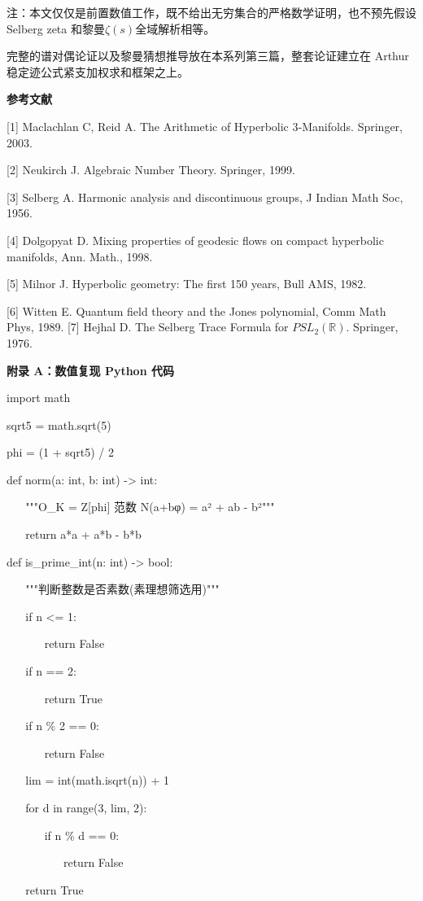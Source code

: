 \documentclass[12pt]{article}
\begin{document}
注：本文仅仅是前置数值工作，既不给出无穷集合的严格数学证明，也不预先假设
Selberg zeta 和黎曼\(\zeta(s)\)全域解析相等。

完整的谱对偶论证以及黎曼猜想推导放在本系列第三篇，整套论证建立在 Arthur
稳定迹公式紧支加权求和框架之上。

\textbf{参考文献}

{[}1{]} Maclachlan C, Reid A. The Arithmetic of Hyperbolic 3‑Manifolds.
Springer, 2003.

{[}2{]} Neukirch J. Algebraic Number Theory. Springer, 1999.

{[}3{]} Selberg A. Harmonic analysis and discontinuous groups, J Indian
Math Soc, 1956.

{[}4{]} Dolgopyat D. Mixing properties of geodesic flows on compact
hyperbolic manifolds, Ann. Math., 1998.

{[}5{]} Milnor J. Hyperbolic geometry: The first 150 years, Bull AMS,
1982.

{[}6{]} Witten E. Quantum field theory and the Jones polynomial, Comm
Math Phys, 1989. {[}7{]} Hejhal D. The Selberg Trace Formula for
\({PSL}_{2}\left( \mathbb{R} \right)\). Springer, 1976.

\textbf{附录 A：数值复现 Python 代码}

import math

sqrt5 = math.sqrt(5)

phi = (1 + sqrt5) / 2

def norm(a: int, b: int) -\textgreater{} int:

~ ~ """O\_K = Z{[}phi{]} 范数 N(a+bφ) = a² + ab - b²"""

~ ~ return a*a + a*b - b*b

def is\_prime\_int(n: int) -\textgreater{} bool:

~ ~ """判断整数是否素数(素理想筛选用)"""

~ ~ if n \textless= 1:

~ ~ ~ ~ return False

~ ~ if n == 2:

~ ~ ~ ~ return True

~ ~ if n \% 2 == 0:

~ ~ ~ ~ return False

~ ~ lim = int(math.isqrt(n)) + 1

~ ~ for d in range(3, lim, 2):

~ ~ ~ ~ if n \% d == 0:

~ ~ ~ ~ ~ ~ return False

~ ~ return True
\end{document}
